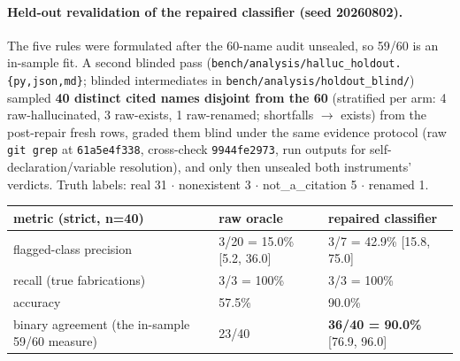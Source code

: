 \documentclass[10pt]{article}
\newcommand{\code}[1]{\texttt{#1}}
\newcommand{\best}[1]{\textbf{#1}}
\begin{document}
\paragraph{Held-out revalidation of the repaired classifier (seed
20260802).} The five rules were formulated after the 60-name audit
unsealed, so 59/60 is an in-sample fit. A second blinded pass
(\code{bench/analysis/halluc\_holdout.\{py,json,md\}}; blinded
intermediates in \code{bench/analysis/holdout\_blind/}) sampled
\textbf{40 distinct cited names disjoint from the 60} (stratified per
arm: 4 raw-hallucinated, 3 raw-exists, 1 raw-renamed; shortfalls $\to$
exists) from the post-repair fresh rows, graded them blind under the
same evidence protocol (raw \code{git grep} at \code{61a5e4f338},
cross-check \code{9944fe2973}, run outputs for
self-declaration/variable resolution), and only then unsealed both
instruments' verdicts. Truth labels: real 31 $\cdot$ nonexistent 3
$\cdot$ not\_a\_citation 5 $\cdot$ renamed 1.

\begin{center}\footnotesize
\begin{tabular}{@{}lll@{}}
\toprule
metric (strict, n=40) & raw oracle & repaired classifier \\
\midrule
flagged-class precision & 3/20 = 15.0\% [5.2, 36.0] & 3/7 = 42.9\% [15.8, 75.0] \\
recall (true fabrications) & 3/3 = 100\% & 3/3 = 100\% \\
accuracy & 57.5\% & 90.0\% \\
binary agreement (the in-sample 59/60 measure) & 23/40 & \best{36/40 = 90.0\%} [76.9, 96.0] \\
\bottomrule
\end{tabular}
\end{center}
\end{document}
